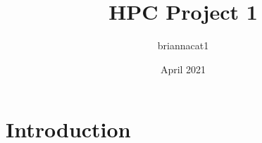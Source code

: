\documentclass{article}
\title{HPC Project 1}
\author{briannacat1 }
\date{April 2021}
\begin{document}
\maketitle

\section{Introduction}
\end{document}
